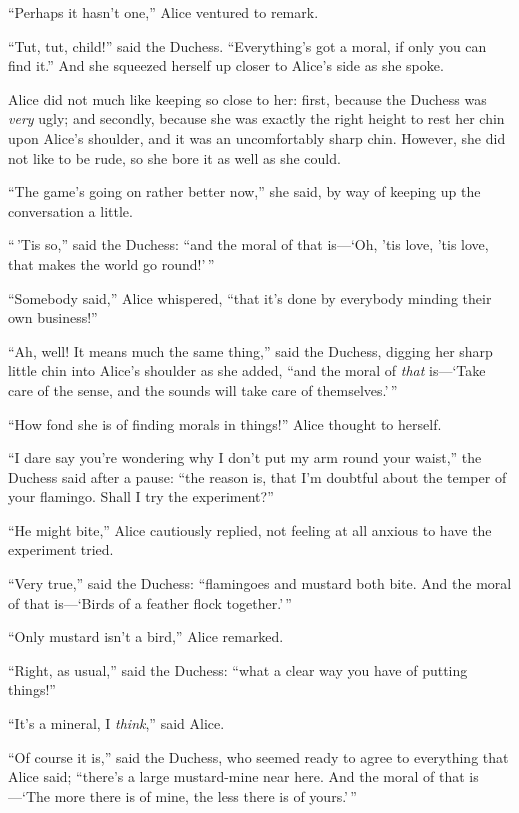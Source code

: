 \documentclass[book, 20pt]{extbook}
\begin{document}
``Perhaps it hasn't one,'' Alice ventured to remark.

``Tut, tut, child!'' said the Duchess. ``Everything's got a moral, if
only you can find it.'' And she squeezed herself up closer to Alice's
side as she spoke.

Alice did not much like keeping so close to her: first, because the
Duchess was \emph{very} ugly; and secondly, because she was exactly the
right height to rest her chin upon Alice's shoulder, and it was an
uncomfortably sharp chin. However, she did not like to be rude, so she
bore it as well as she could.

``The game's going on rather better now,'' she said, by way of keeping
up the conversation a little.

``\,'Tis so,'' said the Duchess: ``and the moral of that is---`Oh, 'tis
love, 'tis love, that makes the world go round!'\,''

``Somebody said,'' Alice whispered, ``that it's done by everybody
minding their own business!''

``Ah, well! It means much the same thing,'' said the Duchess, digging
her sharp little chin into Alice's shoulder as she added, ``and the
moral of \emph{that} is---`Take care of the sense, and the sounds will
take care of themselves.'\,''

``How fond she is of finding morals in things!'' Alice thought to
herself.

``I dare say you're wondering why I don't put my arm round your waist,''
the Duchess said after a pause: ``the reason is, that I'm doubtful about
the temper of your flamingo. Shall I try the experiment?''

``He might bite,'' Alice cautiously replied, not feeling at all anxious
to have the experiment tried.

``Very true,'' said the Duchess: ``flamingoes and mustard both bite. And
the moral of that is---`Birds of a feather flock together.'\,''

``Only mustard isn't a bird,'' Alice remarked.

``Right, as usual,'' said the Duchess: ``what a clear way you have of
putting things!''

``It's a mineral, I \emph{think},'' said Alice.

``Of course it is,'' said the Duchess, who seemed ready to agree to
everything that Alice said; ``there's a large mustard-mine near here.
And the moral of that is---`The more there is of mine, the less there is
of yours.'\,''
\end{document}
